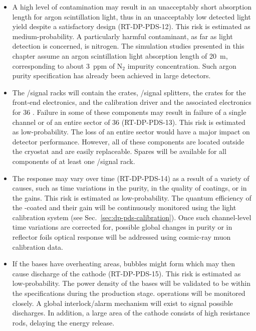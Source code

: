 \begin{itemize}

\item A high level of  contamination may result in an unacceptably short absorption length for argon scintillation light, thus in an unacceptably low detected light yield despite a satisfactory  design (RT-DP-PDS-12). This risk is estimated as medium-probability. A particularly harmful contaminant, as far as light detection is concerned, is nitrogen. The simulation studies presented in this chapter assume an argon scintillation light absorption length of \SI{20}{m}, corresponding to about \SI{3}{ppm} of N$_2$ impurity concentration. Such argon purity specification has already been achieved in large  detectors.

\item The /signal racks will contain the  crates, /signal splitters, the  crates for the front-end electronics, and the calibration  driver and the associated electronics for \num{36} . Failure in some of these components may result in failure of a single  channel or of an entire sector of \num{36}  (RT-DP-PDS-13). This risk is estimated as low-probability. The loss of an entire  sector would have a major impact on detector performance. However, all of these components are located outside the cryostat and are easily replaceable. Spares will be available for all components of at least one /signal rack.

\item The  response may vary over time (RT-DP-PDS-14) as a result of a variety of causes, such as time variations in the  purity, in the quality of  coatings, or in the  gains. This risk is estimated as low-probability. The quantum efficiency of the -coated  and their gain will be continuously monitored using the light calibration system (see Sec.~\ref{sec:dp-pds-calibration}). Once such channel-level time variations are corrected for, possible global changes in  purity or in  reflector foils optical response will be addressed using cosmic-ray muon calibration data. 

\item If the  bases have overheating areas, bubbles might form which may then cause  discharge of the cathode (RT-DP-PDS-15). This risk is estimated as low-probability. The power density of the  bases will be validated to be within the specifications during the production stage.  operations will be monitored closely. A global interlock/alarm mechanism will exist to signal possible discharges. In addition, a large area of the cathode consists of high resistance rods, delaying the energy release.  


\end{itemize}
